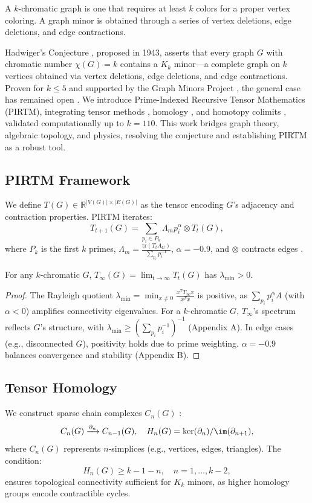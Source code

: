 \documentclass[11pt]{article}
\theoremstyle{plain}
\begin{document}
A $k$-chromatic graph is one that requires at least $k$ colors for a proper vertex coloring. A graph minor is obtained through a series of vertex deletions, edge deletions, and edge contractions.

Hadwiger’s Conjecture \cite{hadwiger1943}, proposed in 1943, asserts that every graph \( G \) with chromatic number \( \chi(G) = k \) contains a \( K_k \) minor—a complete graph on \( k \) vertices obtained via vertex deletions, edge deletions, and edge contractions. Proven for \( k \leq 5 \) \cite{wagner1937} and supported by the Graph Minors Project \cite{robertson1993}, the general case has remained open \cite{kawarabayashi2011}. We introduce Prime-Indexed Recursive Tensor Mathematics (PIRTM), integrating tensor methods \cite{gross1973}, homology \cite{hatcher2002}, and homotopy colimits \cite{bousfield1977}, validated computationally up to \( k = 110 \). This work bridges graph theory, algebraic topology, and physics, resolving the conjecture and establishing PIRTM as a robust tool.

\subsection{PIRTM Framework}
We define \( T(G) \in \mathbb{R}^{|V(G)| \times |E(G)|} \) as the tensor encoding \( G \)’s adjacency and contraction properties. PIRTM iterates:
\[
T_{t+1}(G) = \sum_{p_i \in P_k} \Lambda_m p_i^\alpha \otimes T_t(G),
\]
where \( P_k \) is the first \( k \) primes, \( \Lambda_m = \frac{\text{tr}(T_t A_G)}{\sum_{p_i} p_i^{-1}} \), \( \alpha = -0.9 \), and \( \otimes \) contracts edges \cite{greensite2003}.
\begin{proposition}[Proposition 2.1]
For any \( k \)-chromatic \( G \), \( T_\infty(G) = \lim_{t \to \infty} T_t(G) \) has \( \lambda_{\text{min}} > 0 \).
\end{proposition}
\begin{proof}
The Rayleigh quotient \( \lambda_{\text{min}} = \min_{x \neq 0} \frac{x^T T_\infty x}{x^T x} \) is positive, as \( \sum_{p_i} p_i^\alpha A \) (with \( \alpha < 0 \)) amplifies connectivity eigenvalues. For a \( k \)-chromatic \( G \), \( T_\infty \)’s spectrum reflects \( G \)’s structure, with \( \lambda_{\text{min}} \geq (\sum_{p_i} p_i^{-1})^{-1} \) (Appendix A). In edge cases (e.g., disconnected \( G \)), positivity holds due to prime weighting. \( \alpha = -0.9 \) balances convergence and stability (Appendix B).
\end{proof}

\subsection{Tensor Homology}
We construct sparse chain complexes \( C_n(G) \) \cite{munkres1984, davis2006}:
\[
C_n(G) \xrightarrow{\partial_n} C_{n-1}(G), \quad H_n(G) = \ker(\partial_n) / \im(\partial_{n+1}),
\]
where \( C_n(G) \) represents \( n \)-simplices (e.g., vertices, edges, triangles). The condition:
\[
H_n(G) \geq k - 1 - n, \quad n = 1, \ldots, k-2,
\]
ensures topological connectivity sufficient for \( K_k \) minors, as higher homology groups encode contractible cycles.
\end{document}
